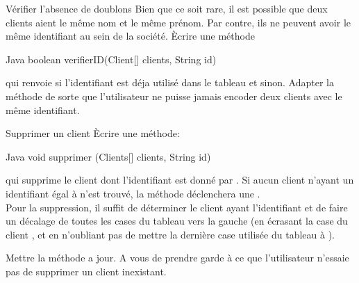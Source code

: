 \documentclass[a4paper,11pt]{article}
\begin{document}
\begin{Exercice}{V\'erifier l'absence de doublons}
		Bien que ce soit rare, il est possible que deux clients aient le m\^eme nom et le m\^eme pr\'enom. Par contre, ils ne peuvent avoir le m\^eme identifiant au sein de la soci\'et\'e. \`Ecrire une m\'ethode
		
		\begin{Code}{Java}
		boolean verifierID(Client[] clients, String id)
		\end{Code}
		
qui renvoie  si l'identifiant  est d\'eja utilis\'e dans le tableau  et  sinon. Adapter la m\'ethode  de sorte que l'utilisateur ne puisse jamais encoder deux clients avec le m\^eme identifiant. 

\end{Exercice}
	
\begin{Exercice}{Supprimer un client}
		\`Ecrire une m\'ethode:
				
		\begin{Code}{Java}
		void supprimer (Clients[] clients, String id)
		\end{Code}

qui supprime le client dont l'identifiant est donn\'e par . Si aucun client n'ayant un identifiant \'egal \`a  n'est trouv\'e, la m\'ethode d\'eclenchera une . \\

Pour la suppression, il suffit de d\'eterminer le client ayant l'identifiant  et de faire un d\'ecalage de toutes les cases du tableau vers la gauche (en \'ecrasant la case du client , et en n'oubliant pas de mettre la dernière case utilisée du tableau à ).

Mettre la m\'ethode  a jour. A vous de prendre garde \`a ce que l'utilisateur n'essaie pas de supprimer un client inexistant.
	
\end{Exercice}

	
	
\end{document}
